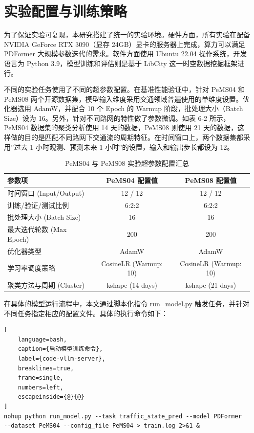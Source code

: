 \section{实验配置与训练策略}
为了保证实验可复现，本研究搭建了统一的实验环境。硬件方面，所有实验在配备 NVIDIA GeForce RTX 3090（显存 24GB）显卡的服务器上完成，算力可以满足 PDFormer 大规模参数迭代的需求。软件方面使用 Ubuntu 22.04 操作系统，开发语言为 Python 3.9，模型训练和评估则是基于 LibCity 这一时空数据挖掘框架进行。

不同的实验任务使用了不同的超参数配置。在基准性能验证中，针对 PeMS04 和 PeMS08 两个开源数据集，模型输入维度采用交通领域普遍使用的单维度设置。优化器选用 AdamW，并配合 10 个 Epoch 的 Warmup 阶段，批处理大小（Batch Size）设为 16。另外，针对不同路网的特性做了参数微调。如表 6-2 所示，PeMS04 数据集的聚类分析使用 14 天的数据，PeMS08 则使用 21 天的数据，这样做的目的是匹配不同路网下交通流的周期特征。在时间窗口上，两个数据集都采用”过去 1 小时观测、预测未来 1 小时”的设置，输入和输出步长都设为 12。


\begin{table}[htbp]
  \centering
  \caption{PeMS04 与 PeMS08 实验超参数配置汇总}
  \label{tab:hyperparameters_pems_final}
  \renewcommand{\arraystretch}{1.2}
  \footnotesize
  \begin{tabular}{lcc}
    \toprule
    \textbf{参数项} & \textbf{PeMS04 配置值} & \textbf{PeMS08 配置值} \\
    \midrule
    时间窗口 (Input/Output) & 12 / 12 & 12 / 12 \\
    训练/验证/测试比例 & 6:2:2 & 6:2:2 \\
    批处理大小 (Batch Size) & 16 & 16 \\
    最大迭代轮数 (Max Epoch) & 200 & 200 \\
    优化器类型 & AdamW & AdamW \\
    学习率调度策略 & CosineLR (Warmup: 10) & CosineLR (Warmup: 10) \\
    聚类方法与周期 (Cluster) & kshape (14 days) & kshape (21 days) \\
    \bottomrule
  \end{tabular}
\end{table}

在具体的模型运行流程中，本文通过脚本化指令 run\_model.py 触发任务，并针对不同任务指定相应的配置文件。具体的执行命令如下：

\begin{lstlisting}[
    language=bash,
    caption={启动模型训练命令},
    label={code-vllm-server},
    breaklines=true,
    frame=single,
    numbers=left,
    escapeinside={@}{@}
]
nohup python run_model.py --task traffic_state_pred --model PDFormer
--dataset PeMS04 --config_file PeMS04 > train.log 2>&1 &
\end{lstlisting}


